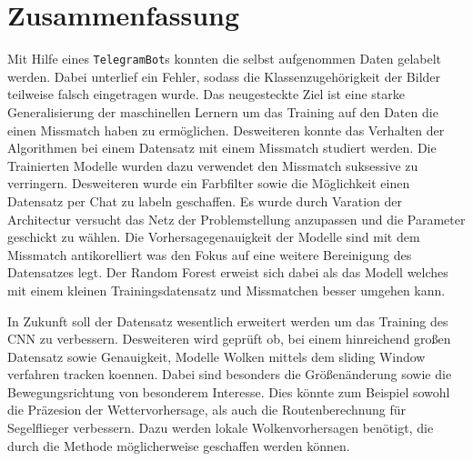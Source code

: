 \section{Zusammenfassung}
\label{sec:05_zusammenfassung}
Mit Hilfe eines \texttt{TelegramBot}s konnten die selbst aufgenommen
Daten gelabelt werden.
Dabei unterlief ein Fehler, sodass die Klassenzugehörigkeit der Bilder teilweise
falsch eingetragen wurde.
Das neugesteckte Ziel ist eine starke Generalisierung der maschinellen Lernern 
um das Training auf den Daten die einen Missmatch haben zu ermöglichen.
Desweiteren konnte das Verhalten der Algorithmen bei einem Datensatz
mit einem Missmatch studiert werden.
Die Trainierten Modelle wurden dazu verwendet den Missmatch 
suksessive zu verringern.
Desweiteren wurde ein Farbfilter sowie die Möglichkeit einen 
Datensatz per Chat zu labeln geschaffen.
Es wurde durch Varation der Architectur versucht das Netz der Problemstellung
anzupassen und die Parameter geschickt zu wählen.
Die Vorhersagegenauigkeit der Modelle sind mit dem Missmatch antikorelliert was
den Fokus auf eine weitere Bereinigung des Datensatzes legt.
Der Random Forest erweist sich dabei als das Modell welches mit 
einem kleinen Trainingsdatensatz und Missmatchen besser umgehen 
kann.

In Zukunft soll der Datensatz wesentlich erweitert werden um das 
Training des CNN zu verbessern.
Desweiteren wird geprüft ob, bei einem hinreichend großen Datensatz sowie
Genauigkeit, 
Modelle Wolken mittels dem sliding Window verfahren tracken koennen.
Dabei sind besonders die Größenänderung sowie die Bewegungsrichtung von
besonderem Interesse.
Dies könnte zum Beispiel sowohl die Präzesion der Wettervorhersage, als auch 
die Routenberechnung für Segelflieger verbessern. 
Dazu werden lokale Wolkenvorhersagen benötigt, die durch die Methode
möglicherweise geschaffen werden können.
